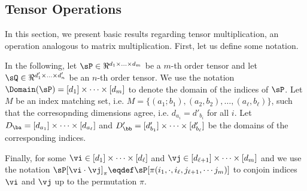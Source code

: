 \subsection{Tensor Operations}
\label{app:tensor-multiplication}

In this section, we present basic results regarding tensor
multiplication, an operation analogous to matrix multiplication.
First, let us define some notation.

In the following, let $\sP \in \Re^{d_1 \times \ldots \times d_m}$ be
  a $m$-th order tensor and let $\sQ \in \Re^{d'_1 \times \ldots \times
  d'_n}$ be an $n$-th order tensor. %
We use the notation $\Domain(\sP) = [d_1] \times \cdots \times [d_m]$
  to denote the domain of the indices of $\sP$.
Let $M$ be an index matching set, i.e. $M = \{ (a_1; b_1),
  (a_2, b_2), \ldots, (a_\ell, b_\ell) \}$, such that the corresopnding
  dimensions agree, i.e. $d_{a_i} = d'_{b_i}$ for all $i$. Let $D_{\ba}
  = [d_{a_1}] \times \cdots \times [d_{a_\ell}]$ and $D'_{\bb}
  = [d'_{b_1}] \times \cdots \times [d'_{b_\ell}]$ be the domains of the
  corresponding indices.

Finally, for some $\vi \in [d_1] \times \cdots \times [d_\ell]$ and $\vj
\in [d_{\ell + 1}] \times \cdots \times [d_m]$ and  we use the notation
$\sP[\vi \cdot \vj]_\pi \eqdef \sP[\pi(i_1, \cdot, i_\ell, j_{\ell+1},
\cdots j_m)]$ to conjoin indices $\vi$ and $\vj$ up to the permutation
$\pi$. 

% 

